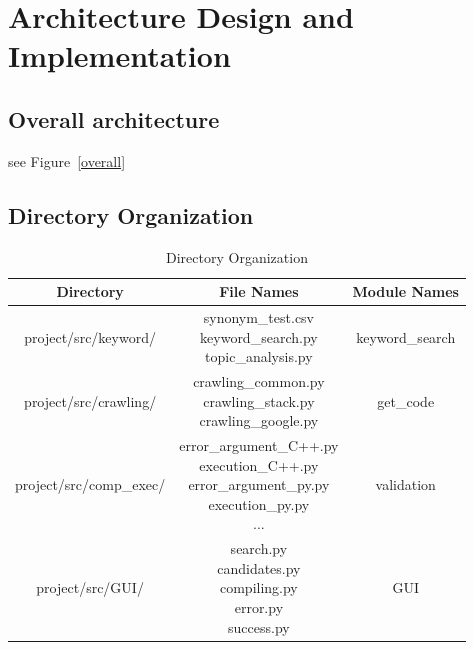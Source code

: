 \documentclass[conference]{IEEEtran}
\begin{document}
\section{Architecture Design and Implementation} %
\label{sec:architecture_design_and_implementation}

\subsection{Overall architecture} %
\label{sub:overall_architecture}

see Figure~\ref{overall}


\subsection{Directory Organization} %
\label{sub:directory_organization}

\begin{table}[h]
\renewcommand{\arraystretch}{1.3}
\caption{Directory Organization}
\label{table:directory_org}
\centering
\begin{adjustbox}{width=0.5\textwidth}
\small
\begin{tabular}{c||c||c}
\hline
\bfseries Directory & \bfseries File Names & \bfseries Module Names \\
\hline\hline
project/src/keyword/  & \parbox[t]{5cm}{synonym\_test.csv \\ keyword\_search.py \\ topic\_analysis.py} & \parbox[t]{5cm}{keyword\_search}\\
\hline
project/src/crawling/ & \parbox[t]{5cm}{crawling\_common.py \\ crawling\_stack.py \\ crawling\_google.py} & \parbox[t]{5cm}{get\_code}\\
\hline
project/src/comp\_exec/ &\parbox[t]{5cm}{error\_argument\_C++.py \\ execution\_C++.py \\ error\_argument\_py.py \\ execution\_py.py \\ ... } & \parbox[t]{5cm}{validation}\\
\hline
project/src/GUI/ & \parbox[t]{5cm}{search.py \\candidates.py \\ compiling.py \\ error.py \\ success.py} & \parbox[t]{5cm}{GUI}\\
\hline

\end{tabular}
\end{adjustbox}
\end{table}
\end{document}
